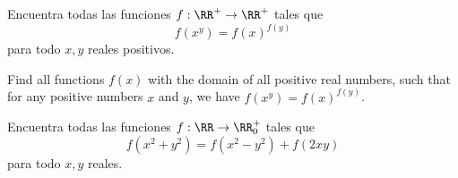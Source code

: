 \begin{problem}
  Encuentra todas las funciones $f:\RR^+\to\RR^+$ tales que
  \[f(x^y)=f(x)^{f(y)}\]
  para todo $x,y$ reales positivos.
  \begin{hint}
    Find all functions $f(x)$ with the domain of all positive real numbers, such
    that for any positive numbers $x$ and $y$, we have $f(x^y)=f(x)^{f(y)}$.
  \end{hint}
\end{problem}

\begin{problem}
  Encuentra todas las funciones $f:\RR\to\RR^+_0$ tales que
  \[f(x^2+y^2)=f(x^2-y^2)+f(2xy)\]
  para todo $x,y$ reales.
\end{problem}

